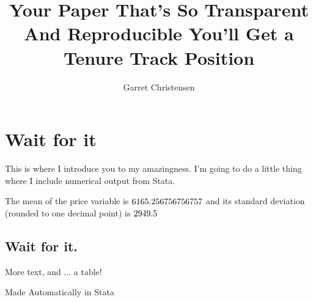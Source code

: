 \documentclass[11pt]{article} %
\title{Your Paper That's So Transparent And Reproducible You'll Get a Tenure Track Position}
\author{Garret Christensen}
\begin{document}

\maketitle

\section{Wait for it}

This is where I introduce you to my amazingness.
I'm going to do a little thing where I include numerical output from Stata.

The mean of the price variable is $6165.256756756757$ and its standard deviation (rounded to one decimal point) is $2949.5$

\subsection{Wait for it.}

More text, and ... a table! 

\begin{table}
\caption{Made Automatically in Stata}
\end{table}

\end{document}
